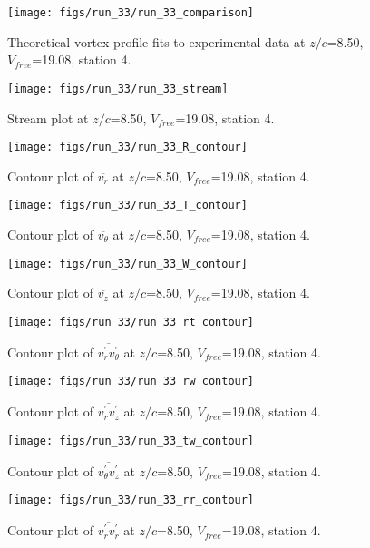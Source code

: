 \begin{figure}[H]
\centering
\texttt{[image: figs/run\_33/run\_33\_comparison]}
\caption{Theoretical vortex profile fits to experimental data at $z/c$=8.50, $V_{free}$=19.08, station 4.}
\end{figure}


\begin{figure}[H]
\centering
\texttt{[image: figs/run\_33/run\_33\_stream]}
\caption{Stream plot at $z/c$=8.50, $V_{free}$=19.08, station 4.}
\end{figure}


\begin{figure}[H]
\centering
\texttt{[image: figs/run\_33/run\_33\_R\_contour]}
\caption{Contour plot of $\overline{v_{r}}$ at $z/c$=8.50, $V_{free}$=19.08, station 4.}
\end{figure}


\begin{figure}[H]
\centering
\texttt{[image: figs/run\_33/run\_33\_T\_contour]}
\caption{Contour plot of $\overline{v_{\theta}}$ at $z/c$=8.50, $V_{free}$=19.08, station 4.}
\end{figure}


\begin{figure}[H]
\centering
\texttt{[image: figs/run\_33/run\_33\_W\_contour]}
\caption{Contour plot of $\overline{v_{z}}$ at $z/c$=8.50, $V_{free}$=19.08, station 4.}
\end{figure}


\begin{figure}[H]
\centering
\texttt{[image: figs/run\_33/run\_33\_rt\_contour]}
\caption{Contour plot of $\overline{v_{r}^{\prime} v_{\theta}^{\prime}}$ at $z/c$=8.50, $V_{free}$=19.08, station 4.}
\end{figure}


\begin{figure}[H]
\centering
\texttt{[image: figs/run\_33/run\_33\_rw\_contour]}
\caption{Contour plot of $\overline{v_{r}^{\prime} v_{z}^{\prime}}$ at $z/c$=8.50, $V_{free}$=19.08, station 4.}
\end{figure}


\begin{figure}[H]
\centering
\texttt{[image: figs/run\_33/run\_33\_tw\_contour]}
\caption{Contour plot of $\overline{v_{\theta}^{\prime} v_{z}^{\prime}}$ at $z/c$=8.50, $V_{free}$=19.08, station 4.}
\end{figure}


\begin{figure}[H]
\centering
\texttt{[image: figs/run\_33/run\_33\_rr\_contour]}
\caption{Contour plot of $\overline{v_{r}^{\prime} v_{r}^{\prime}}$ at $z/c$=8.50, $V_{free}$=19.08, station 4.}
\end{figure}


